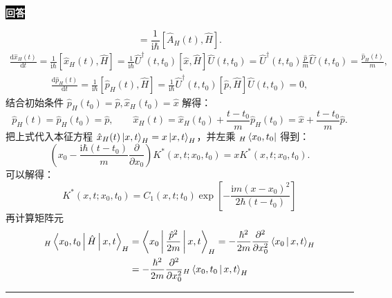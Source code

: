 \documentclass[11pt,a4paper]{ctexart}
\newenvironment{answer}
  {\par\smallskip\noindent
   \begingroup
   \setlength{\fboxsep}{4pt}%
   \colorbox{black}{\textcolor{white}{\bfseries 回答}}%
   \endgroup
   \quad\ignorespaces}
  {\par\smallskip\noindent\rule{\linewidth}{0.4pt}\medskip}
\begin{document}
\begin{answer}
\begin{enumerate}
\begin{equation}
      =\frac{1 }{\mathrm{i}\hbar } \left[\hat{A}_H(t),\hat{H} \right].
    \end{equation}
    \begin{equation}
      \begin{aligned}
        \frac{\mathrm{d} \hat{x}_H(t)}{\mathrm{d}t }
        =\frac{1 }{\mathrm{i}\hbar } \left[\hat{x}_H(t),\hat{H} \right]
        =\frac{1 }{\mathrm{i}\hbar } \hat{U}^\dag(t,t_0) \left[\hat{x},\hat{H} \right] \hat{U}(t,t_0)
        =\hat{U}^\dag(t,t_0)  \frac{\hat{p} }{m } \hat{U}(t,t_0)
        =\frac{\hat{p}_H(t) }{m } ,
      \end{aligned}
    \end{equation}
    \begin{equation}
      \begin{aligned}
        \frac{\mathrm{d} \hat{p}_H(t)}{\mathrm{d}t }
        =\frac{1 }{\mathrm{i}\hbar } \left[\hat{p}_H(t),\hat{H} \right]
        =\frac{1 }{\mathrm{i}\hbar } \hat{U}^\dag(t,t_0) \left[\hat{p},\hat{H} \right] \hat{U}(t,t_0)
        =0,
      \end{aligned}
    \end{equation}
    结合初始条件 $\hat{p}_H(t_0)=\hat{p},\hat{x}_H(t_0)=\hat{x} $ 解得：
    \begin{equation}
      \hat{p}_H(t) = \hat{p}_H(t_0) = \hat{p},\qquad
      \hat{x}_H(t) = \hat{x}_H(t_0) + \frac{t-t_0 }{m } \hat{p}_H(t_0) = \hat{x} + \frac{t-t_0 }{m } \hat{p}.  
    \end{equation}
    把上式代入本征方程 $\hat{x}_H(t) \Ket{x,t }_H = x \Ket{x,t }_H $，并左乘 ${}_H\Bra{x_0,t_0 } $ 得到：
    \begin{equation}
      \left(x_0 - \frac{\mathrm{i}\hbar\left(t-t_0 \right) }{m } \frac{\partial }{\partial x_0 }  \right) K^*(x,t;x_0,t_0)
      =x K^*(x,t;x_0,t_0).
    \end{equation}
    可以解得：
    \begin{equation}
      K^*(x,t;x_0,t_0)
      =C_1(x,t;t_0) \exp\left[-\frac{\mathrm{i}m\left(x-x_0 \right)^2 }{2\hbar (t-t_0) }  \right]
    \end{equation}
    再计算矩阵元
    \begin{equation}
      \begin{aligned}
        {}_H\Braket{x_0,t_0|\hat{H}|x,t }_H
        &=\Braket{x_0|\frac{\hat{p}^2 }{2m } |x,t }_H
        =-\frac{\hbar^2 }{2m }\frac{\partial^2 }{\partial x_0^2 } \Braket{x_0|x,t }_H \\
        &=-\frac{\hbar^2 }{2m }\frac{\partial^2 }{\partial x_0^2 } {}_H\Braket{x_0,t_0|x,t }_H 

\end{aligned}
\end{equation}
\end{enumerate}
\end{answer}
\end{document}
